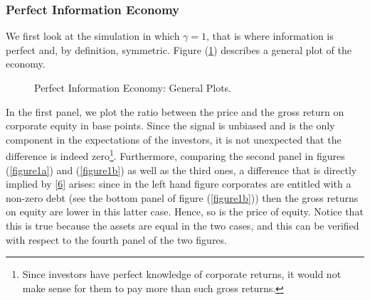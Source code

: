 \documentclass[11pt]{article}
\begin{document}
\subsubsection{Perfect Information Economy}
We first look at the simulation in which $\gamma=1$, that is where information is perfect and, by definition, symmetric. Figure (\ref{figure1}) describes a general plot of the economy.
\begin{figure}[h!]
\centering
{}\quad
{}
 \caption{Perfect Information Economy: General Plots.} \label{figure1}
\end{figure}
In the first panel, we plot the ratio between the price and the gross return on corporate equity in base points. Since the signal is unbiased and is the only component in the expectations of the investors, it is not unexpected that the difference is indeed zero\footnote{Since investors have perfect knowledge of corporate returns, it would not make sense for them to pay more than such gross returns.}. Furthermore, comparing the second panel in figures (\ref{figure1a}) and (\ref{figure1b}) as well as the third ones, a difference that is directly implied by \eqref{6} arises: since in the left hand figure corporates are entitled with a non-zero debt (see the bottom panel of figure (\ref{figure1b})) then the gross returns on equity are lower in this latter case. Hence, so is the price of equity. Notice that this is true because the assets are equal in the two cases, and this can be verified with respect to the fourth panel of the two figures.
\end{document}
